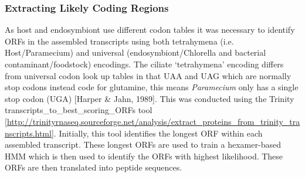 \documentclass[a4paper,11pt]{article}
\begin{document}
\subsubsection{Extracting Likely Coding Regions}
As host and endosymbiont use different codon tables it was necessary to identify ORFs in the assembled transcripts using both tetrahymena (i.e. Host/Paramecium) and universal (endosymbiont/Chlorella and bacterial contaminant/foodstock) encodings.  
The ciliate `tetrahymena' encoding differs from universal codon look up tables in that UAA and UAG which are normally stop codons instead code for glutamine, this means \textit{Paramecium} only has a single stop codon (UGA) [Harper \& Jahn, 1989].
This was conducted using the Trinity transcripts\_to\_best\_scoring\_ORFs tool [\url{http://trinityrnaseq.sourceforge.net/analysis/extract_proteins_from_trinity_transcripts.html}].  
Initially, this tool identifies the longest ORF within each assembled transcript.  
These longest ORFs are used to train a hexamer-based HMM which is then used to identify the ORFs with highest likelihood.  
These ORFs are then translated into peptide sequences. 
\end{document}

